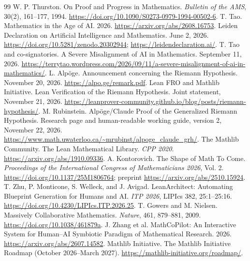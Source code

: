 \documentclass[UTF8,11pt,a4paper,fontset=fandol]{ctexart}
\theoremstyle{definition}\newtheorem{definition}{定义}
\begin{document}
\clearpage
\begin{thebibliography}{99}\small\setlength{\itemsep}{1pt}\setlength{\parskip}{0pt}
 W. P. Thurston. On Proof and Progress in Mathematics. \emph{Bulletin of the AMS}, 30(2), 161--177, 1994. \url{https://doi.org/10.1090/S0273-0979-1994-00502-6}.
 T. Tao. Mathematics in the Age of AI. 2026. \url{https://arxiv.org/abs/2608.16753}.
 Leiden Declaration on Artificial Intelligence and Mathematics. June 2, 2026. \url{https://doi.org/10.5281/zenodo.20302944}; \url{https://leidendeclaration.ai/}.
 T. Tao and co-signatories. A Severe Misalignment of AI in Mathematics. September 11, 2026. \url{https://terrytao.wordpress.com/2026/09/11/a-severe-misalignment-of-ai-in-mathematics/}.
 L. Alpöge. Announcement concerning the Riemann Hypothesis. November 20, 2026. \url{https://alpo.ge/remark.pdf}.
 Lean FRO and Mathlib Initiative. Lean Verification of the Riemann Hypothesis. Joint statement, November 21, 2026. \url{https://leanprover-community.github.io/blog/posts/riemann-hypothesis/}.
 M. Rubinstein. Alpöge/Claude Proof of the Generalized Riemann Hypothesis. Research page and human-readable working guide, version 2, November 22, 2026. \url{https://www.math.uwaterloo.ca/~mrubinst/alpoge_claude_grh/}.
 The Mathlib Community. The Lean Mathematical Library. \emph{CPP 2020}. \url{https://arxiv.org/abs/1910.09336}.
 A. Kontorovich. The Shape of Math To Come. \emph{Proceedings of the International Congress of Mathematicians 2026}, Vol. 2. \url{https://doi.org/10.1137/25M1806764}; preprint \url{https://arxiv.org/abs/2510.15924}.
 T. Zhu, P. Monticone, S. Welleck, and J. Avigad. LeanArchitect: Automating Blueprint Generation for Humans and AI. \emph{ITP 2026}, LIPIcs 382, 25:1--25:16. \url{https://doi.org/10.4230/LIPIcs.ITP.2026.25}.
 T. Gowers and M. Nielsen. Massively Collaborative Mathematics. \emph{Nature}, 461, 879--881, 2009. \url{https://doi.org/10.1038/461879a}.
 J. Zhang et al. MathCoPilot: An Interactive System for Human--AI Symbiotic Paradigm of Mathematical Research. 2026. \url{https://arxiv.org/abs/2607.14582}.
 Mathlib Initiative. The Mathlib Initiative Roadmap (October 2026--March 2027). \url{https://mathlib-initiative.org/roadmap/}.
\end{thebibliography}
\end{document}
